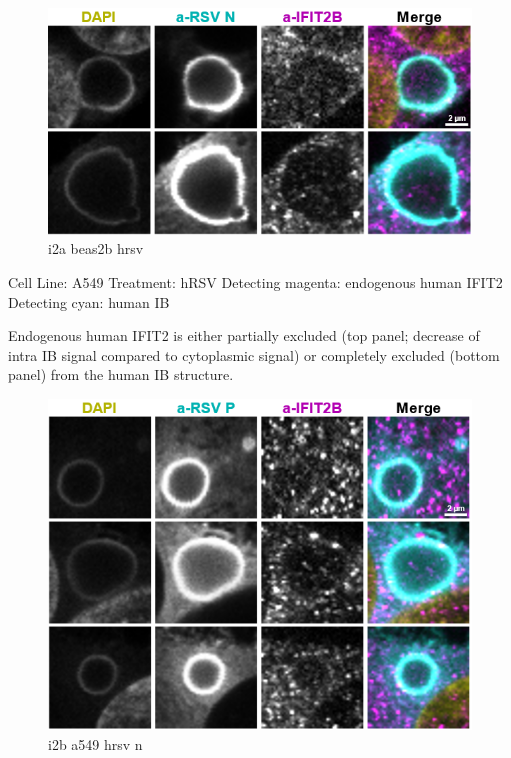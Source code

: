 \begin{figure}
    \centering
    \includegraphics[width=1\linewidth]{10. Chapter 5/Figs/01. Infection/04. i2b a549 hrsv n.png}
    \caption[i2a beas2b hrsv]{i2a beas2b hrsv}
    \label{fig:i2a beas2b hrsv}
\end{figure}

Cell Line: A549 \newline
Treatment: hRSV \newline
Detecting magenta: endogenous human IFIT2  \newline
Detecting cyan: human IB \newline

Endogenous human IFIT2 is either partially excluded (top panel; decrease of intra IB signal compared to cytoplasmic signal) or completely excluded (bottom panel) from the human IB structure.

\begin{figure}
    \centering
    \includegraphics[width=1\linewidth]{10. Chapter 5/Figs/01. Infection/05. i2b a549 hrsv p.png}
    \caption[i2b a549 hrsv n]{i2b a549 hrsv n}
    \label{fig:i2b a549 hrsv n}
\end{figure}

